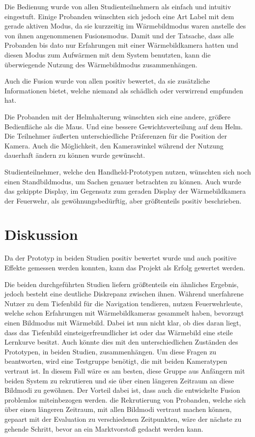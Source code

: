 Die Bedienung wurde von allen Studienteilnehmern als einfach und intuitiv eingestuft.
Einige Probanden wünschten sich jedoch eine Art Label mit dem gerade aktiven Modus, da sie kurzzeitig im Wärmebildmodus waren anstelle des von ihnen angenommenen Fusionsmodus.
Damit und  \ggf der Tatsache, dass alle Probanden bis dato nur Erfahrungen mit einer Wärmebildkamera hatten und diesen Modus zum Aufwärmen mit dem System benutzten, kann die überwiegende Nutzung des Wärmebildmodus zusammenhängen.

Auch die Fusion wurde von allen positiv bewertet, da sie zusätzliche Informationen bietet, welche niemand als schädlich oder verwirrend empfunden hat.

Die Probanden mit der Helmhalterung wünschten sich eine andere, größere Bedienfläche als die Maus.
Und eine bessere Gewichtsverteilung auf dem Helm.
Die Teilnehmer äußerten unterschiedliche Präferenzen für die Position der Kamera.
Auch die Möglichkeit, den Kamerawinkel während der Nutzung dauerhaft ändern zu können wurde gewünscht.

Studienteilnehmer, welche den Handheld-Prototypen nutzen, wünschten sich noch einen Standbildmodus, um Sachen genauer betrachten zu können.
Auch wurde das gekippte Display, im Gegensatz zum geraden Display der Wärmebildkamera der Feuerwehr, als gewöhnungsbedürftig, aber größtenteils positiv beschrieben.

\pagebreak
\section{Diskussion}
Da der Prototyp in beiden Studien positiv bewertet wurde und auch positive Effekte gemessen werden konnten, kann das Projekt \profire als Erfolg gewertet werden.

Die beiden durchgeführten Studien liefern größtenteils ein ähnliches Ergebnis, jedoch besteht eine deutliche Diskrepanz zwischen ihnen.
Während unerfahrene Nutzer zu dem Tiefenbild für die Navigation tendieren, nutzen Feuerwehrleute, welche schon Erfahrungen mit Wärmebildkameras gesammelt haben, bevorzugt einen Bildmodus mit Wärmebild.
Dabei ist nun nicht klar, ob dies daran liegt, dass das Tiefenbild einsteigerfreundlicher ist oder das Wärmebild eine steile Lernkurve besitzt.
Auch könnte dies mit den unterschiedlichen Zuständen des Prototypen, in beiden Studien, zusammenhängen.
Um diese Fragen zu beantworten, wird eine Testgruppe benötigt, die mit beiden Kameratypen vertraut ist.
In diesem Fall wäre es am besten, diese Gruppe aus Anfängern mit beiden System zu rekrutieren und sie über einen längeren Zeitraum an diese Bildmodi zu gewöhnen.
Der Vorteil dabei ist, dass auch die entwickelte Fusion problemlos miteinbezogen werden.
\Dh die Rekrutierung von Probanden, welche sich über einen längeren Zeitraum, mit allen Bildmodi vertraut machen können, gepaart mit der Evaluation zu verschiedenen Zeitpunkten, wäre der nächste zu gehende Schritt, bevor an ein Marktvorstoß gedacht werden kann.

